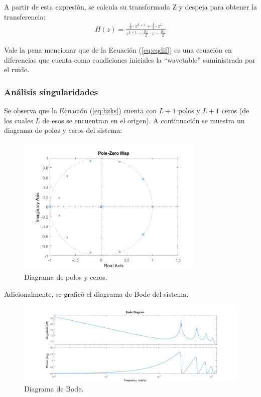 A partir de esta expresión, se calcula su transformada Z y despeja para obtener la transferencia:
\begin{align}
H(z) = \frac{\frac{1}{2} \cdot z^{L+1} +\frac{1}{2} \cdot z^{L} }{z^{L+1} - \frac{R_L}{2} \cdot z - \frac{R_L}{2}}
\label{eq:hzks}
\end{align}  

Vale la pena mencionar que de la Ecuación (\ref{eq:eqdif}) es una ecuación en diferencias que cuenta como condiciones iniciales la ``wavetable'' suministrada por el ruido.

\subsubsection{Análisis singularidades}
Se observa que la Ecuación (\ref{eq:hzks}) cuenta con $L+1$ polos y $L+1$ ceros (de los cuales $L$ de esos se encuentran en el origen). A continuación se muestra un diagrama de polos y ceros del sistema:
\begin{figure}[H]
	\centering
	\includegraphics[width=0.8\textwidth]{ImagenesEjercicio4/pzks.PNG}
\caption{Diagrama de polos y ceros.}
	\label{fig:zpdig}
\end{figure}

Adicionalmente, se graficó el diagrama de Bode del sistema.
\begin{figure}[H]
	\centering
	\includegraphics[width=\textwidth]{ImagenesEjercicio4/bodeks.PNG}
	\caption{Diagrama de Bode.}
	\label{fig:bode}
\end{figure}

